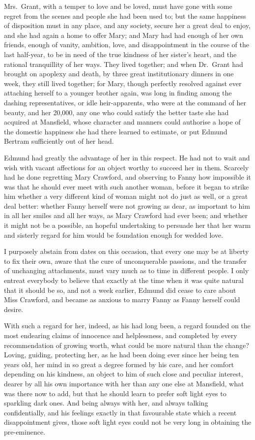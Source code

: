 Mrs.\ Grant, with a temper to love and be loved, must have
gone with some regret from the scenes and people she
had been used to; but the same happiness of disposition
must in any place, and any society, secure her a great
deal to enjoy, and she had again a home to offer Mary;
and Mary had had enough of her own friends, enough of vanity,
ambition, love, and disappointment in the course of the
last half-year, to be in need of the true kindness of her
sister's heart, and the rational tranquillity of her ways.
They lived together; and when Dr.\ Grant had brought
on apoplexy and death, by three great institutionary
dinners in one week, they still lived together; for Mary,
though perfectly resolved against ever attaching herself
to a younger brother again, was long in finding among
the dashing representatives, or idle heir-apparents,
who were at the command of her beauty, and her 20,000,
any one who could satisfy the better taste she had acquired
at Mansfield, whose character and manners could authorise
a hope of the domestic happiness she had there learned
to estimate, or put Edmund Bertram sufficiently out of her head.

Edmund had greatly the advantage of her in this respect.
He had not to wait and wish with vacant affections for an
object worthy to succeed her in them.  Scarcely had he
done regretting Mary Crawford, and observing to Fanny
how impossible it was that he should ever meet with such
another woman, before it began to strike him whether
a very different kind of woman might not do just as well,
or a great deal better:  whether Fanny herself were not
growing as dear, as important to him in all her smiles
and all her ways, as Mary Crawford had ever been;
and whether it might not be a possible, an hopeful
undertaking to persuade her that her warm and sisterly
regard for him would be foundation enough for wedded love.

I purposely abstain from dates on this occasion,
that every one may be at liberty to fix their own,
aware that the cure of unconquerable passions, and the
transfer of unchanging attachments, must vary much as
to time in different people.  I only entreat everybody
to believe that exactly at the time when it was quite
natural that it should be so, and not a week earlier,
Edmund did cease to care about Miss Crawford, and became
as anxious to marry Fanny as Fanny herself could desire.

With such a regard for her, indeed, as his had long been,
a regard founded on the most endearing claims of innocence
and helplessness, and completed by every recommendation
of growing worth, what could be more natural than
the change?  Loving, guiding, protecting her, as he
had been doing ever since her being ten years old,
her mind in so great a degree formed by his care,
and her comfort depending on his kindness, an object to him
of such close and peculiar interest, dearer by all his
own importance with her than any one else at Mansfield,
what was there now to add, but that he should learn
to prefer soft light eyes to sparkling dark ones.
And being always with her, and always talking confidentially,
and his feelings exactly in that favourable state
which a recent disappointment gives, those soft light
eyes could not be very long in obtaining the pre-eminence.

